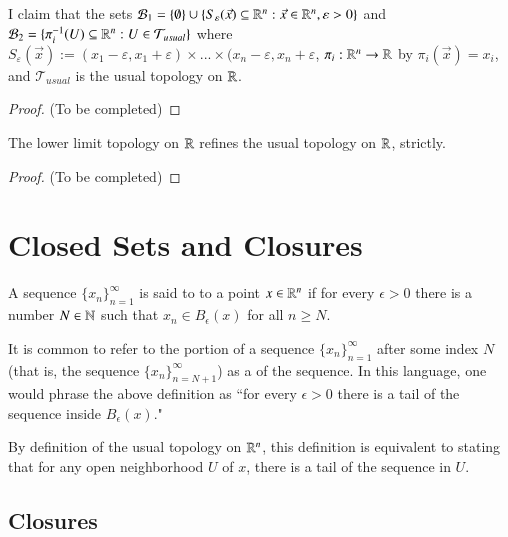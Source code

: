 \documentclass[12pt, a4paper, oneside, openright, titlepage]{book}
\begin{document}
\begin{xca}
    I claim that the sets $\mathcal{B}_1 =  \{\emptyset\}\cup\{S_{\varepsilon}(\vec{x}) \subseteq \mathbb R^n:\vec{x} \in \mathbb R^n, \varepsilon >0\}$ and $\mathcal{B}_2 = \{\pi_i^{-1}(U) \subseteq \mathbb R^n:U \in \mathcal{T}_{usual}\}$ where $S_{\varepsilon}(\vec{x}) := (x_1-\varepsilon,x_1+\varepsilon)\times ... \times(x_n-\varepsilon,x_n+\varepsilon$, $\pi_i:\mathbb R^n\rightarrow \mathbb R$ by $\pi_i(\vec{x}) = x_i$, and $\mathcal{T}_{usual}$ is the usual topology on $\mathbb R$.
\end{xca}
\begin{proof}
    (To be completed)
\end{proof}


\begin{xca}
    The lower limit topology on $\mathbb R$ refines the usual topology on $\mathbb R$, strictly.
\end{xca}
\begin{proof}
    (To be completed)
\end{proof}




\section{Closed Sets and Closures}


\begin{defn}
    A sequence $\{x_n\}_{n=1}^{\infty}$ is said to  to a point $x \in \mathbb R^n$ if for every $\epsilon > 0$ there is a number $N \in \mathbb N$ such that $x_n \in B_{\epsilon}(x)$ for all $n \geq N$.
\end{defn}

\begin{rmk}
    It is common to refer to the portion of a sequence $\{x_n\}_{n=1}^{\infty}$ after some index $N$ (that is, the sequence $\{x_n\}_{n=N+1}^{\infty}$) as a  of the sequence. In this language, one would phrase the above definition as ``for every $\epsilon > 0$ there is a tail of the sequence inside $B_{\epsilon}(x)$."
\end{rmk}

\begin{rmk}
    By definition of the usual topology on $\mathbb R^n$, this definition is equivalent to stating that for any open neighborhood $U$ of $x$, there is a tail of the sequence in $U$.
\end{rmk}


\subsection{Closures}
\end{document}
